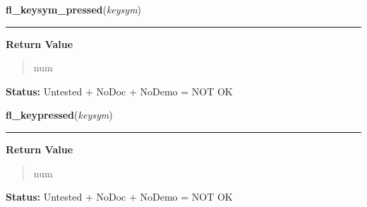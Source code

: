 \hspace{.8\funcindent}\begin{boxedminipage}{\funcwidth}

    \raggedright \textbf{fl\_keysym\_pressed}(\textit{keysym})

    \vspace{-1.5ex}

    \rule{\textwidth}{0.5\fboxrule}
\setlength{\parskip}{2ex}
\setlength{\parskip}{1ex}
      \textbf{Return Value}
    \vspace{-1ex}

      \begin{quote}
      num

      \end{quote}

\textbf{Status:} Untested + NoDoc + NoDemo = NOT OK



    \end{boxedminipage}

    \label{xformslib:library:fl_keysym_pressed}

    \vspace{0.5ex}

\hspace{.8\funcindent}\begin{boxedminipage}{\funcwidth}

    \raggedright \textbf{fl\_keypressed}(\textit{keysym})

    \vspace{-1.5ex}

    \rule{\textwidth}{0.5\fboxrule}
\setlength{\parskip}{2ex}
\setlength{\parskip}{1ex}
      \textbf{Return Value}
    \vspace{-1ex}

      \begin{quote}
      num

      \end{quote}

\textbf{Status:} Untested + NoDoc + NoDemo = NOT OK



    \end{boxedminipage}

    \label{xformslib:library:fl_set_defaults}

